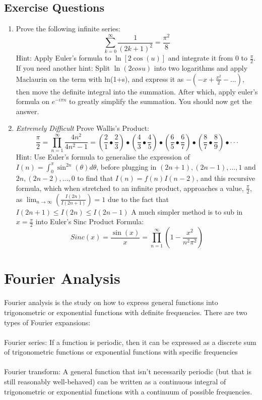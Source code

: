 \documentclass[a4paper,12pt,oneside]{book}
\begin{document}
\subsection{Exercise Questions}
\begin{enumerate}[!ht]
    \item Prove the following infinite series:
    \[\sum_{k=0}^{\infty} \frac{1}{(2k+1)^2} = \frac{\pi^2}{8}\]
    Hint: Apply Euler's formula to $\ln[2\cos(u)]$ and integrate it from 0 to $\frac{\pi}{2}$.
    If you need another hint: Split $\ln(2cosu)$ into two logarithms and apply Maclaurin on the term with ln(1+s), and express it as $-(-x+\frac{x^2}{2}-...)$, then move the definite integral into the summation. After which, apply euler's formula on $e^{-i\pi n}$ to greatly simplify the summation. You should now get the answer.
    \item \textit{Extremely Difficult} Prove Wallis's Product:
    \[\frac{\pi}{2} = \prod_{n=1}^{\infty} \frac{4n^2}{4n^2-1} = (\frac{2}{1}\bullet \frac{2}{3})\bullet (\frac{4}{3}\bullet \frac{4}{5})\bullet (\frac{6}{5}\bullet \frac{6}{7})\bullet (\frac{8}{7}\bullet \frac{8}{9})\bullet \cdot \cdot \cdot\]
    Hint: Use Euler's formula to generalise the expression of $I(n)=\int_0^{\pi} \sin^{2n}(\theta) d\theta$, before plugging in $(2n+1), (2n-1),...,1$ and $2n, (2n-2),...,0$ to find that $I(n)=f(n)I(n-2)$, and this recursive formula, which when stretched to an infinite product, approaches a value, $\frac{\pi}{2}$, as $\lim_{n \to \infty}(\frac{I(2n)}{I(2n+1)})=1$ due to the fact that $I(2n+1)\leq I(2n)\leq I(2n-1)$
    A much simpler method is to sub in $x=\frac{\pi}{2}$ into Euler's Sinc Product Formula:
    \[Sinc(x)=\frac{\sin(x)}{x}=\prod^{\infty}_{n=1}(1-\frac{x^2}{n^2\pi^2})\]
\end{enumerate}

\section{Fourier Analysis}
Fourier analysis is the study on how to express general functions into trigonometric or exponential functions with definite frequencies. There are two types of Fourier expansions:\\\\
Fourier series: If a function is periodic, then it can be expressed as a discrete sum of trigonometric functions or exponential functions with specific frequencies\\\\
 Fourier transform: A general function that isn’t necessarily periodic (but that is still reasonably well-behaved) can be written as a continuous integral of trigonometric or exponential functions with a continuum of possible frequencies.
\end{document}
